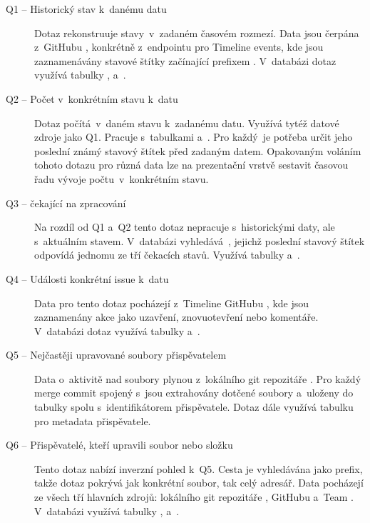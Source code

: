 \begin{description}
  \item[Q1 -- Historický stav \PR k~danému datu]
    Dotaz rekonstruuje stavy~\PR v~zadaném časovém rozmezí. Data jsou čerpána z~\REST \API GitHubu , konkrétně z~endpointu pro Timeline events, kde jsou zaznamenávány stavové štítky začínající prefixem  . V~databázi dotaz využívá tabulky ,  a~.

  \item[Q2 -- Počet \PR v~konkrétním stavu k~datu]
    Dotaz počítá~\PR v~daném stavu k~zadanému datu. Využívá tytéž datové zdroje jako Q1. Pracuje s~tabulkami  a~. Pro každý~\PR je potřeba určit jeho poslední známý stavový štítek před zadaným datem. Opakovaným voláním tohoto dotazu pro různá data lze na prezentační vrstvě sestavit časovou řadu vývoje počtu~\PR v~konkrétním stavu.

  \item[Q3 -- \PR čekající na zpracování]
    Na rozdíl od Q1 a~Q2 tento dotaz nepracuje s~historickými daty, ale s~aktuálním stavem. V~databázi vyhledává~\PR, jejichž poslední stavový štítek odpovídá jednomu ze tří čekacích stavů. Využívá tabulky  a~.

  \item[Q4 -- Události konkrétní issue k~datu]
    Data pro tento dotaz pocházejí z~Timeline \API GitHubu , kde jsou zaznamenány akce jako uzavření, znovuotevření nebo komentáře. V~databázi dotaz využívá tabulky  a~.

  \item[Q5 -- Nejčastěji upravované soubory přispěvatelem]
    Data o~aktivitě nad soubory plynou z~lokálního git repozitáře . Pro každý merge commit spojený s~\PR jsou extrahovány dotčené soubory a~uloženy do tabulky  spolu s~identifikátorem přispěvatele. Dotaz dále využívá tabulku  pro metadata přispěvatele.

  \item[Q6 -- Přispěvatelé, kteří upravili soubor nebo složku]
    Tento dotaz nabízí inverzní pohled k~Q5. Cesta je vyhledávána jako prefix, takže dotaz pokrývá jak konkrétní soubor, tak celý adresář. Data pocházejí ze všech tří hlavních zdrojů: lokálního git repozitáře , \REST \API GitHubu  a~Team \API {}. V~databázi využívá tabulky ,  a~.


\end{description}
